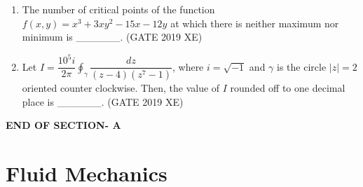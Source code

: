 \documentclass[journal,12pt,onecolumn]{IEEEtran}
\begin{document}
\begin{enumerate}
\item The number of critical points of the function $f(x,y)=x^3+3xy^2-15x-12y$ at which there is neither maximum nor minimum is \_\_\_\_\_\_.
\hfill{(GATE 2019 XE)} \\

\item Let $I=\dfrac{10^5i}{2\pi}\oint_{\gamma}\dfrac{dz}{(z-4)(z^7-1)}$, where $i=\sqrt{-1}$ and $\gamma$ is the circle $|z|=2$ oriented counter clockwise. Then, the value of $I$ rounded off to one decimal place is \_\_\_\_\_\_.
\hfill{(GATE 2019 XE)} \\

\end{enumerate}

\vspace{2\baselineskip}
\begin{center}
    \item[\textbf{END OF SECTION- A}]
\end{center}


\newpage


\section*{Fluid Mechanics}
\noindent
\bigskip
\end{document}
